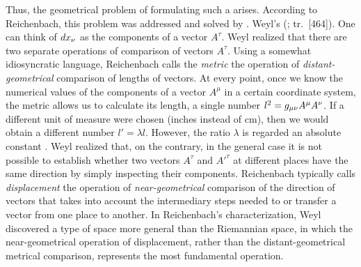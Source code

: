 \documentclass[final]{article}
\renewcommand{\rzlap}[2]{(\cite[#1]{Reichenbach1928}; tr.\ [#2])\xspace}
\begin{document}
Thus, the geometrical problem of formulating such a  arises. According to Reichenbach, this problem was addressed and solved by \citet{Weyl1918a,Weyl1918b}. Weyl's  \rzlap{333}{464}. One can think of $dx_{\nu}$ as the components of a vector $A^\tau$. Weyl realized that there are two separate operations of comparison of vectors $A^\tau$. Using a somewhat idiosyncratic language, Reichenbach calls the \emph{metric} the operation of \emph{distant-geometrical} comparison of lengths of vectors. At every point, once we know the numerical values of the components of a vector $A^\mu$ in a certain coordinate system, the metric \gmn allows us to calculate its length, a single number $l^2=g_{\mu\nu} A^\mu A^\nu$. If a different unit of measure were chosen (inches instead of cm), then we would obtain a different number $l'=\lambda l$. However, the ratio $\lambda$ is regarded an absolute constant \citep[see][102]{Weyl1919a}. Weyl realized that, on the contrary, in the general case it is not possible to establish whether two vectors $A^\tau$ and $A'^\tau$ at different places have the same direction by simply inspecting their components. Reichenbach typically calls \emph{displacement} the operation of \emph{near-geometrical} comparison of the direction of vectors that takes into account the intermediary steps needed to  or transfer a vector from one place to another. In Reichenbach's characterization, Weyl discovered a type of space more general than the Riemannian space, in which the near-geometrical operation of displacement, rather than the distant-geometrical metrical comparison, represents the most fundamental operation. 
 

\end{document}
